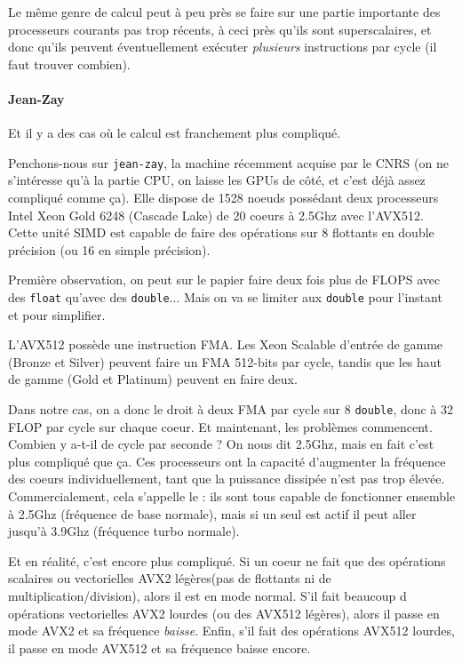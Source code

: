 Le même genre de calcul peut à peu près se faire sur une partie importante des
processeurs courants pas trop récents, à ceci près qu'ils sont superscalaires,
et donc qu'ils peuvent éventuellement exécuter \emph{plusieurs} instructions par
cycle (il faut trouver combien).

\paragraph{Jean-Zay} Et il y a des cas où le calcul est franchement plus
compliqué.

Penchons-nous sur \texttt{jean-zay}, la machine récemment acquise par le CNRS
(on ne s'intéresse qu'à la partie CPU, on laisse les GPUs de côté, et c'est déjà
assez compliqué comme ça). Elle dispose de 1528 noeuds possédant deux
processeurs Intel Xeon Gold 6248 (Cascade Lake) de 20 coeurs à 2.5Ghz avec
l'\textsf{AVX512}. Cette unité SIMD est capable de faire des opérations sur 8
flottants en double précision (ou 16 en simple précision).

Première observation, on peut sur le papier faire deux fois plus de FLOPS avec
des \texttt{float} qu'avec des \texttt{double}... Mais on va se limiter aux
\texttt{double} pour l'instant et pour simplifier.

L'\textsf{AVX512} possède une instruction FMA. Les Xeon Scalable d'entrée de
gamme (Bronze et Silver) peuvent faire un FMA 512-bits par cycle, tandis que les
haut de gamme (Gold et Platinum) peuvent en faire deux.

Dans notre cas, on a donc le droit à deux FMA par cycle sur 8 \texttt{double},
donc à 32 FLOP par cycle sur chaque coeur. Et maintenant, les problèmes
commencent. Combien y a-t-il de cycle par seconde ? On nous dit \og 2.5Ghz\fg,
mais en fait c'est plus compliqué que ça. Ces processeurs ont la capacité
d'augmenter la fréquence des coeurs individuellement, tant que la puissance
dissipée n'est pas trop élevée. Commercialement, cela s'appelle le
 : ils sont tous capable de fonctionner ensemble à 2.5Ghz
(fréquence de base normale), mais si un seul est actif il peut aller jusqu'à
3.9Ghz (fréquence turbo normale).

Et en réalité, c'est encore plus compliqué. Si un coeur ne fait que des
opérations scalaires ou vectorielles AVX2 \og légères\fg (pas de flottants ni de
multiplication/division), alors il est en mode \og normal\fg. S'il fait
beaucoup d opérations vectorielles AVX2 lourdes (ou des AVX512 légères), alors il passe
en mode AVX2 et sa fréquence \emph{baisse}. Enfin, s'il fait des opérations
AVX512 lourdes, il passe en mode AVX512 et sa fréquence baisse encore.

